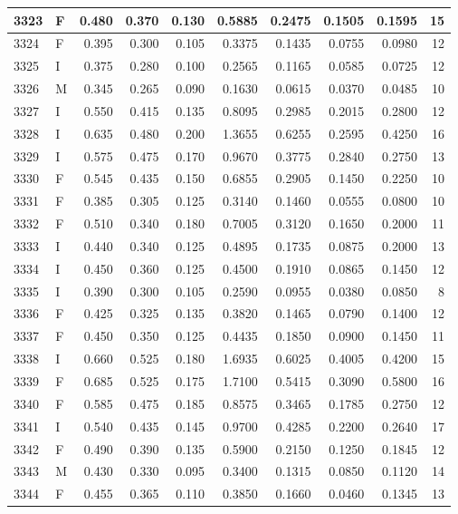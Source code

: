 \documentclass[9pt,twocolumn,twoside,]{pnas-new}
\begin{document}
\begin{tabular}{l|l|r|r|r|r|r|r|r|r}
\hline
3323 & F & 0.480 & 0.370 & 0.130 & 0.5885 & 0.2475 & 0.1505 & 0.1595 & 15\\
\hline
3324 & F & 0.395 & 0.300 & 0.105 & 0.3375 & 0.1435 & 0.0755 & 0.0980 & 12\\
\hline
3325 & I & 0.375 & 0.280 & 0.100 & 0.2565 & 0.1165 & 0.0585 & 0.0725 & 12\\
\hline
3326 & M & 0.345 & 0.265 & 0.090 & 0.1630 & 0.0615 & 0.0370 & 0.0485 & 10\\
\hline
3327 & I & 0.550 & 0.415 & 0.135 & 0.8095 & 0.2985 & 0.2015 & 0.2800 & 12\\
\hline
3328 & I & 0.635 & 0.480 & 0.200 & 1.3655 & 0.6255 & 0.2595 & 0.4250 & 16\\
\hline
3329 & I & 0.575 & 0.475 & 0.170 & 0.9670 & 0.3775 & 0.2840 & 0.2750 & 13\\
\hline
3330 & F & 0.545 & 0.435 & 0.150 & 0.6855 & 0.2905 & 0.1450 & 0.2250 & 10\\
\hline
3331 & F & 0.385 & 0.305 & 0.125 & 0.3140 & 0.1460 & 0.0555 & 0.0800 & 10\\
\hline
3332 & F & 0.510 & 0.340 & 0.180 & 0.7005 & 0.3120 & 0.1650 & 0.2000 & 11\\
\hline
3333 & I & 0.440 & 0.340 & 0.125 & 0.4895 & 0.1735 & 0.0875 & 0.2000 & 13\\
\hline
3334 & I & 0.450 & 0.360 & 0.125 & 0.4500 & 0.1910 & 0.0865 & 0.1450 & 12\\
\hline
3335 & I & 0.390 & 0.300 & 0.105 & 0.2590 & 0.0955 & 0.0380 & 0.0850 & 8\\
\hline
3336 & F & 0.425 & 0.325 & 0.135 & 0.3820 & 0.1465 & 0.0790 & 0.1400 & 12\\
\hline
3337 & F & 0.450 & 0.350 & 0.125 & 0.4435 & 0.1850 & 0.0900 & 0.1450 & 11\\
\hline
3338 & I & 0.660 & 0.525 & 0.180 & 1.6935 & 0.6025 & 0.4005 & 0.4200 & 15\\
\hline
3339 & F & 0.685 & 0.525 & 0.175 & 1.7100 & 0.5415 & 0.3090 & 0.5800 & 16\\
\hline
3340 & F & 0.585 & 0.475 & 0.185 & 0.8575 & 0.3465 & 0.1785 & 0.2750 & 12\\
\hline
3341 & I & 0.540 & 0.435 & 0.145 & 0.9700 & 0.4285 & 0.2200 & 0.2640 & 17\\
\hline
3342 & F & 0.490 & 0.390 & 0.135 & 0.5900 & 0.2150 & 0.1250 & 0.1845 & 12\\
\hline
3343 & M & 0.430 & 0.330 & 0.095 & 0.3400 & 0.1315 & 0.0850 & 0.1120 & 14\\
\hline
3344 & F & 0.455 & 0.365 & 0.110 & 0.3850 & 0.1660 & 0.0460 & 0.1345 & 13\\

\end{tabular}
\end{document}
